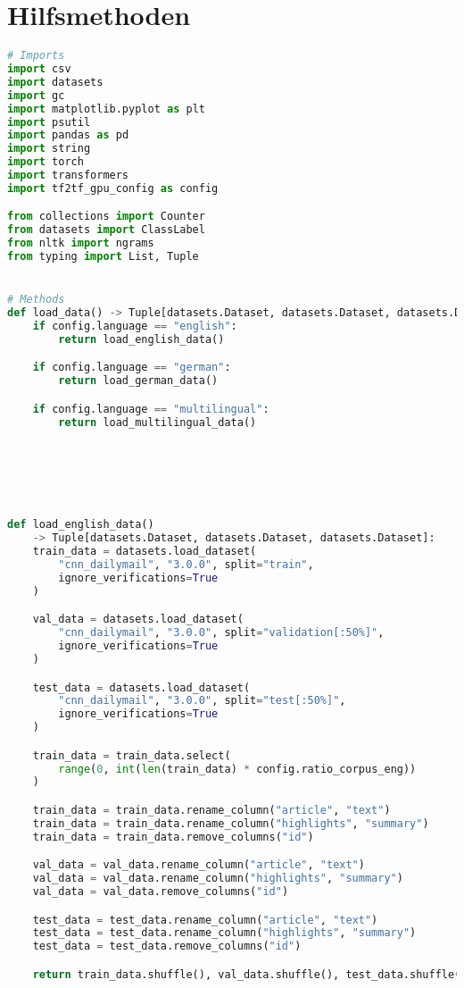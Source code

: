 \section*{Hilfsmethoden}
\begin{lstlisting}[language=Python, caption=Hilfsmethoden]
# Imports
import csv
import datasets
import gc
import matplotlib.pyplot as plt
import psutil
import pandas as pd
import string
import torch
import transformers
import tf2tf_gpu_config as config

from collections import Counter
from datasets import ClassLabel
from nltk import ngrams
from typing import List, Tuple


# Methods
def load_data() -> Tuple[datasets.Dataset, datasets.Dataset, datasets.Dataset]:
    if config.language == "english":
        return load_english_data()

    if config.language == "german":
        return load_german_data()

    if config.language == "multilingual":
        return load_multilingual_data()






def load_english_data()
	-> Tuple[datasets.Dataset, datasets.Dataset, datasets.Dataset]:
    train_data = datasets.load_dataset(
        "cnn_dailymail", "3.0.0", split="train",
        ignore_verifications=True
    )

    val_data = datasets.load_dataset(
        "cnn_dailymail", "3.0.0", split="validation[:50%]",
        ignore_verifications=True
    )

    test_data = datasets.load_dataset(
        "cnn_dailymail", "3.0.0", split="test[:50%]",
        ignore_verifications=True
    )

    train_data = train_data.select(
        range(0, int(len(train_data) * config.ratio_corpus_eng))
    )

    train_data = train_data.rename_column("article", "text")
    train_data = train_data.rename_column("highlights", "summary")
    train_data = train_data.remove_columns("id")

    val_data = val_data.rename_column("article", "text")
    val_data = val_data.rename_column("highlights", "summary")
    val_data = val_data.remove_columns("id")

    test_data = test_data.rename_column("article", "text")
    test_data = test_data.rename_column("highlights", "summary")
    test_data = test_data.remove_columns("id")

    return train_data.shuffle(), val_data.shuffle(), test_data.shuffle()



\end{lstlisting}
